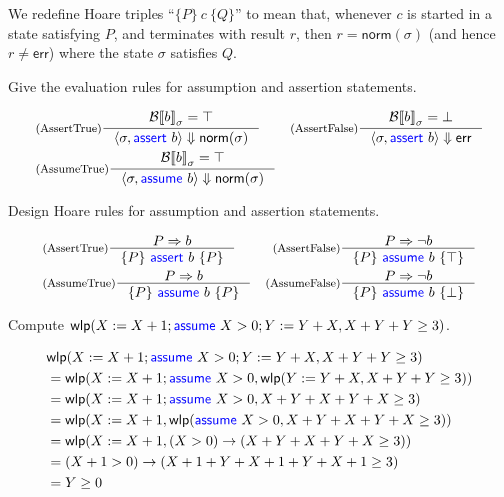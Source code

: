 \documentclass[11pt,a4paper]{article}
\newcommand{\pair}[1]{\langle #1 \rangle}
\newcommand{\evalB}[2]{{\mathcal{B}\llbracket #1 \rrbracket}_{#2}}
\newcommand{\evalC}[3]{\pair{#1, #2} \Downarrow #3}
\newcommand{\norm}[1]{\textsf{norm}(#1)}
\newcommand{\err}{\textsf{err}}
\newcommand{\kword}[1]{{\color{blue} \textsf{#1}}}
\newcommand{\Assume}{\kword{assume}}
\newcommand{\Assert}{\kword{assert}}
\newcommand{\wlp}[2]{\textsf{wlp}(#1, #2)}
\begin{document}
We redefine Hoare triples ``$\{P\}~c~\{Q\}$'' to mean that, whenever $c$ is started in a state satisfying $P$, and terminates with result $r$, then $r=\norm{\sigma}$ (and hence $r\not=\err$) where the state $\sigma$ satisfies $Q$.

\subproblem Give the evaluation rules for assumption and assertion statements.

\begin{solution}
\begin{align*}
  &\inference[(AssertTrue)]{\evalB{b}{\sigma} = \top}{\evalC{\sigma}{\Assert~b}{\norm{\sigma}}}
  &\inference[(AssertFalse)]{\evalB{b}{\sigma} = \bot}{\evalC{\sigma}{\Assert~b}{\err}} \\
  &\inference[(AssumeTrue)]{\evalB{b}{\sigma} = \top}{\evalC{\sigma}{\Assume~b}{\norm{\sigma}}}
\end{align*}

\end{solution}

\subproblem Design Hoare rules for assumption and assertion statements.

\begin{solution}
\begin{align*}
  &\inference[(AssertTrue)]{P \Rightarrow b}{\{P\}~\Assert~b~\{P\}}
  &\inference[(AssertFalse)]{P \Rightarrow \lnot b}{\{P\}~\Assume~b~\{\top\}} \\
  &\inference[(AssumeTrue)]{P \Rightarrow b}{\{P\}~\Assume~b~\{P\}}
  &\inference[(AssumeFalse)]{P \Rightarrow \lnot b}{\{P\}~\Assume~b~\{\bot\}}
\end{align*}
\end{solution}

\subproblem Compute $\wlp{X := X + 1; \Assume~X > 0; Y := Y + X}{X + Y + Y \ge 3}$.

\begin{solution}
\begin{align*}
  &\wlp{X := X + 1; \Assume~X > 0; Y := Y + X}{X + Y + Y \ge 3} \\
  &= \wlp{X := X + 1; \Assume~X > 0}{\wlp{Y := Y + X}{X + Y + Y \ge 3}} \\
  &= \wlp{X := X + 1; \Assume~X > 0}{X + Y + X + Y + X \ge 3} \\
  &= \wlp{X := X + 1}{\wlp{\Assume~X > 0}{X + Y + X + Y + X \ge 3}} \\
  &= \wlp{X := X + 1}{(X > 0) \rightarrow (X + Y + X + Y + X \ge 3)} \\
  &= (X + 1 > 0) \rightarrow (X + 1 + Y + X + 1 + Y + X + 1 \ge 3) \\
  &= Y \ge 0
\end{align*}
\end{solution}

\end{document}
